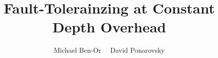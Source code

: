 \documentclass[manuscript,screen,review]{acmart}
\begin{document}

\title{ Fault-Tolerainzing at Constant Depth Overhead }
\author{Michael Ben-Or \ \ David Ponarovsky}
\maketitle

\newcommand*{\Mbas}{\mathcal{X}^\prime}
\newcommand*{\bas}{\mathcal{X}}
\newcommand*{\sMbas}{\Mbas}
\newcommand*{\QQ}{C_{X}/C_{Z}^\perp }
\newcommand*{\trig}{ Triorthogonal }
\newcommand*{\Hyp}{ Hyperproduct }
\newcommand*{\Cin}{ C_{\text{initial}} }
\newcommand*{\Ctan}{ C_{\text{Tan}} }



\newcommand*{\QACze}{\mathbf{QAC}_{0}}
\newcommand*{\QNCzef}{\mathbf{QNC}_{0,f}}
\newcommand*{\QNCze}{\mathbf{QNC}_{0}}
\newcommand*{\QNCon}{\mathbf{QNC}_{1}}
\newcommand*{\NCon}{\mathbf{NC}_{1}}
\newcommand*{\noiseQNCon}{noisy-$\QNCon$}
\newcommand*{\QNC}{\mathbf{QNC}}
\newcommand*{\QNCG}{\mathbf{QNC_G}}
\newcommand*{\NC}{\mathbf{NC}}
\newcommand*{\QNCiG}{\mathbf{QNC_{G,i}}}


\newcommand*{\CDO} {CDFT} 
%
%
%





\printbibliography
\end{document}
